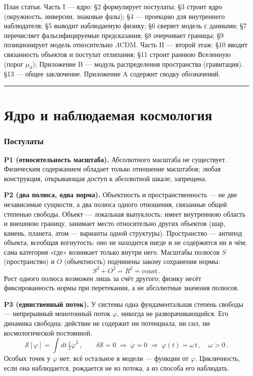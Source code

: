 \documentclass{article}
\begin{document}
План статьи. Часть I --- ядро: \S2 формулирует постулаты; \S3 строит ядро (окружность, инверсии, знаковые фазы); \S4 --- проекцию для внутреннего наблюдателя; \S5 выводит наблюдаемую физику; \S6 сверяет модель с данными; \S7 перечисляет фальсифицируемые предсказания; \S8 очерчивает границы; \S9 позиционирует модель относительно $\Lambda$CDM. Часть II --- второй этаж: \S10 вводит связанность объектов и постулат отлипания; \S11 строит раннюю Вселенную (порог $\mu_d$); Приложение B --- модуль распределения пространства (гравитация). \S13 --- общее заключение. Приложение A содержит сводку обозначений.

\bigskip
\hrule
\bigskip

\part{Ядро и наблюдаемая космология}
\section{Постулаты}

\noindent\textbf{P1 (относительность масштаба).} Абсолютного масштаба не существует. Физическим содержанием обладает только отношение масштабов; любая конструкция, открывающая доступ к абсолютной шкале, запрещена.

\medskip
\noindent\textbf{P2 (два полюса, одна норма).} Объектность и пространственность --- не две независимые сущности, а два полюса одного отношения, связанные общей степенью свободы. Объект --- локальная выпуклость: имеет внутреннюю область и внешнюю границу, занимает место относительно других объектов (шар, камень, планета, атом --- варианты одной структуры). Пространство --- антипод объекта, всеобщая вогнутость: оно не находится нигде и не содержится ни в чём; сама категория «где» возникает только внутри него. Масштабы полюсов $S$ (пространство) и $O$ (объектность) подчинены закону сохранения нормы:
\begin{equation}
S^2 + O^2 = R^2 = \text{const}\,.
\end{equation}
Рост одного полюса возможен лишь за счёт другого; физику несёт фиксированность нормы при перетекании, а не абсолютные значения полюсов.

\medskip
\noindent\textbf{P3 (единственный поток).} У системы одна фундаментальная степень свободы --- непрерывный монотонный поток $\varphi$, никогда не разворачивающийся. Его динамика свободна: действие не содержит ни потенциала, ни сил, ни космологической постоянной,
\begin{equation}
\mathcal{S}[\varphi] = \int dt\, \tfrac{1}{2}\dot{\varphi}^2\,, \qquad \delta\mathcal{S} = 0 \;\Rightarrow\; \ddot{\varphi} = 0 \;\Rightarrow\; \varphi(t) = \omega\,t\,, \quad \omega > 0\,.
\end{equation}
Особых точек у $\varphi$ нет; всё остальное в модели --- функции от $\varphi$. Цикличность, если она наблюдается, рождается не из потока, а из способа его наблюдать.
\end{document}
